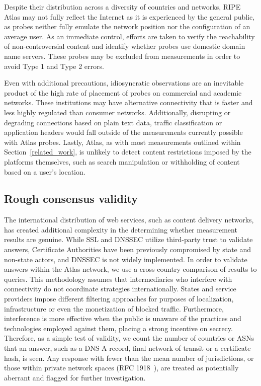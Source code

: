 Despite their distribution across a diversity of countries and networks,
RIPE Atlas may not fully reflect the Internet as it is experienced by
the general public, as probes neither fully emulate the network position
nor the configuration of an average user. As an immediate control,
efforts are taken to verify the reachability of non-controversial
content and identify whether probes use domestic domain name servers.
These probes may be excluded from measurements in order to avoid Type 1
and Type 2 errors.

Even with additional precautions, idiosyncratic observations are an
inevitable product of the high rate of placement of probes on commercial
and academic networks. These institutions may have alternative
connectivity that is faster and less highly regulated than consumer
networks. Additionally, disrupting or degrading connections based on
plain text data, traffic classification or application headers would fall
outside of the measurements currently possible with Atlas probes.
Lastly, Atlas, as with most measurements outlined within
Section~\ref{related_work}, is unlikely to detect content restrictions
imposed by the platforms themselves, such as search manipulation or 
withholding of content based on a user's location.

\subsection{Rough consensus validity}

The international distribution of web services, such as content delivery
networks, has created additional complexity in the determining whether
measurement results are genuine. While SSL and DNSSEC utilize
third-party trust to validate answers, Certificate Authorities have been
previously compromised by state and non-state actors, and DNSSEC is not
widely implemented. In order to validate answers within the Atlas
network, we use a cross-country comparison of results to queries. This
methodology assumes that intermediaries who interfere with connectivity
do not coordinate strategies internationally. States and service
providers impose different filtering approaches for purposes of
localization, infrastructure or even the monetization of blocked
traffic. Furthermore, interference is more effective when the public is
unaware of the practices and technologies employed against them, placing
a strong incentive on secrecy. Therefore, as a simple test of validity,
we count the number of countries or ASNs that an answer, such as a DNS A
record, final network of transit or a certificate hash, is seen. Any
response with fewer than the mean number of jurisdictions, or those
within private network spaces (RFC 1918~\cite{rfc1918}), are treated as
potentially aberrant and flagged for further investigation.

